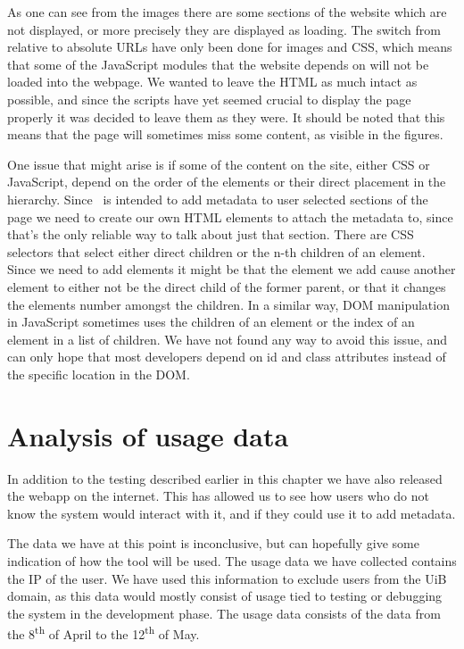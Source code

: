 As one can see from the images there are some sections of the website which are not displayed, or more precisely they
are displayed as loading.
The switch from relative to absolute URLs have only been done for images and CSS,
which means that some of the JavaScript modules that the website depends on will not be loaded into the webpage.
We wanted to leave the HTML as much intact as possible,
and since the scripts have yet seemed crucial to display the page properly it was decided to leave them as they were.
It should be noted that this means that the page will sometimes miss some content, as visible in the figures.

One issue that might arise is if some of the content on the site, either CSS or JavaScript,
depend on the order of the elements or their direct placement in the hierarchy.
Since \theartefact\ is intended to add metadata to user selected sections of the page we need to create our own
HTML elements to attach the metadata to, since that's the only reliable way to talk about just that section.
There are CSS selectors that select either direct children or the n-th children of an element.
Since we need to add elements it might be that the element we add cause another element to either not be the direct
child of the former parent, or that it changes the elements number amongst the children.
In a similar way, DOM manipulation in JavaScript sometimes uses the children of an element or the index of an element
in a list of children.
We have not found any way to avoid this issue,
and can only hope that most developers depend on id and class attributes instead of the specific location in the DOM.

\section{Analysis of usage data}
In addition to the testing described earlier in this chapter we have also released the webapp on the internet.
This has allowed us to see how users who do not know the system would interact with it,
and if they could use it to add metadata.

The data we have at this point is inconclusive, but can hopefully give some indication of how the tool will be used.
The usage data we have collected contains the IP of the user.
We have used this information to exclude users from the UiB domain,
as this data would mostly consist of usage tied to testing or debugging the system in the development phase.
The usage data consists of the data from the 8\textsuperscript{th}	 of April to the 12\textsuperscript{th} of May.

